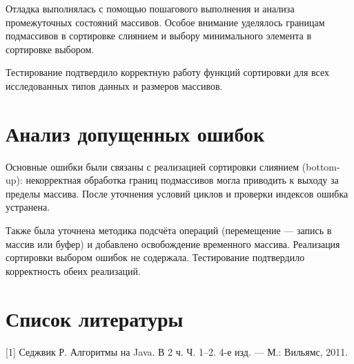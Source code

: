 \documentclass[a4paper,12pt]{article}
\begin{document}
Отладка выполнялась с помощью пошагового выполнения и анализа
промежуточных состояний массивов. Особое внимание уделялось границам
подмассивов в сортировке слиянием и выбору минимального элемента в
сортировке выбором.

Тестирование подтвердило корректную работу функций сортировки для всех
исследованных типов данных и размеров массивов.

\section{Анализ допущенных ошибок}

Основные ошибки были связаны с реализацией сортировки слиянием
(bottom-up): некорректная обработка границ подмассивов могла приводить
к выходу за пределы массива. После уточнения условий циклов и проверки
индексов ошибка устранена.

Также была уточнена методика подсчёта операций (перемещение — запись в
массив или буфер) и добавлено освобождение временного массива.
Реализация сортировки выбором ошибок не содержала. Тестирование
подтвердило корректность обеих реализаций.

\section{Список литературы}

[1] Седжвик Р. Алгоритмы на Java. В 2 ч. Ч. 1–2. 4-е изд. — М.: Вильямс, 2011.
\end{document}
